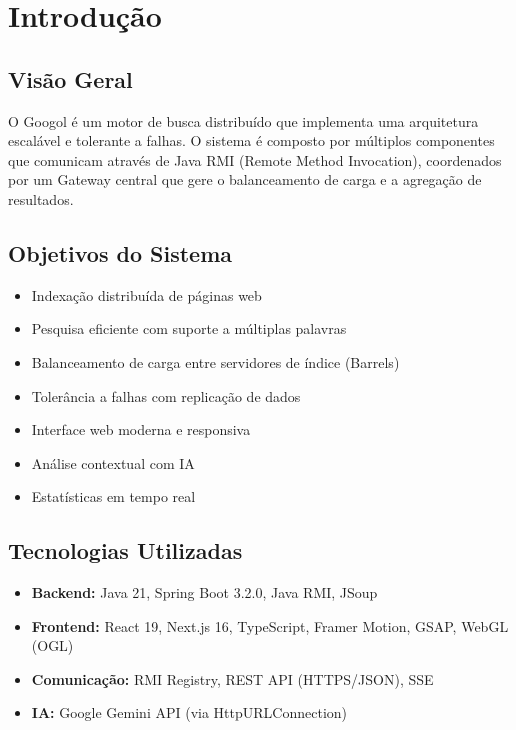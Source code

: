 \documentclass[12pt,a4paper]{article}
\begin{document}
\newpage

\section{Introdução}

\subsection{Visão Geral}
O Googol é um motor de busca distribuído que implementa uma arquitetura escalável e tolerante a falhas. O sistema é composto por múltiplos componentes que comunicam através de Java RMI (Remote Method Invocation), coordenados por um Gateway central que gere o balanceamento de carga e a agregação de resultados.

\subsection{Objetivos do Sistema}
\begin{itemize}
    \item Indexação distribuída de páginas web
    \item Pesquisa eficiente com suporte a múltiplas palavras
    \item Balanceamento de carga entre servidores de índice (Barrels)
    \item Tolerância a falhas com replicação de dados
    \item Interface web moderna e responsiva
    \item Análise contextual com IA
    \item Estatísticas em tempo real
\end{itemize}

\subsection{Tecnologias Utilizadas}
\begin{itemize}
    \item \textbf{Backend:} Java 21, Spring Boot 3.2.0, Java RMI, JSoup
    \item \textbf{Frontend:} React 19, Next.js 16, TypeScript, Framer Motion, GSAP, WebGL (OGL)
    \item \textbf{Comunicação:} RMI Registry, REST API (HTTPS/JSON), SSE
    \item \textbf{IA:} Google Gemini API (via HttpURLConnection)
\end{itemize}
\end{document}
